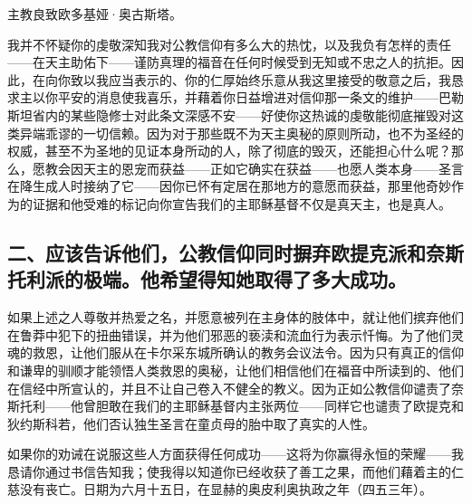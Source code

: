 \newline{}主教良致欧多基娅·奥古斯塔。\par

\newline{}我并不怀疑你的虔敬深知我对公教信仰有多么大的热忱，以及我负有怎样的责任——在天主助佑下——谨防真理的福音在任何时候受到无知或不忠之人的抗拒。因此，在向你致以我应当表示的、你的仁厚始终乐意从我这里接受的敬意之后，我恳求主以你平安的消息使我喜乐，并藉着你日益增进对信仰那一条文的维护——巴勒斯坦省内的某些隐修士对此条文深感不安——好使你这热诚的虔敬能彻底摧毁对这类异端乖谬的一切信赖。因为对于那些既不为天主奥秘的原则所动，也不为圣经的权威，甚至不为圣地的见证本身所动的人，除了彻底的毁灭，还能担心什么呢？那么，愿教会因天主的恩宠而获益——正如它确实在获益——也愿人类本身——圣言在降生成人时接纳了它——因你已怀有定居在那地方的意愿而获益，那里他奇妙作为的证据和他受难的标记向你宣告我们的主耶稣基督不仅是真天主，也是真人。\par


\subsection{二、应该告诉他们，公教信仰同时摒弃欧提克派和奈斯托利派的极端。他希望得知她取得了多大成功。}

\newline{}如果上述之人尊敬并热爱之名，并愿意被列在主身体的肢体中，就让他们摈弃他们在鲁莽中犯下的扭曲错误，并为他们邪恶的亵渎和流血行为表示忏悔。为了他们灵魂的救恩，让他们服从在卡尔采东城所确认的教务会议法令。因为只有真正的信仰和谦卑的驯顺才能领悟人类救恩的奥秘，让他们相信他们在福音中所读到的、他们在信经中所宣认的，并且不让自己卷入不健全的教义。因为正如公教信仰谴责了奈斯托利——他曾胆敢在我们的主耶稣基督内主张两位——同样它也谴责了欧提克和狄约斯科若，他们否认独生圣言在童贞母的胎中取了真实的人性。\par

\newline{}如果你的劝诫在说服这些人方面获得任何成功——这将为你赢得永恒的荣耀——我恳请你通过书信告知我；使我得以知道你已经收获了善工之果，而他们藉着主的仁慈没有丧亡。日期为六月十五日，在显赫的奥皮利奥执政之年（四五三年）。\par



